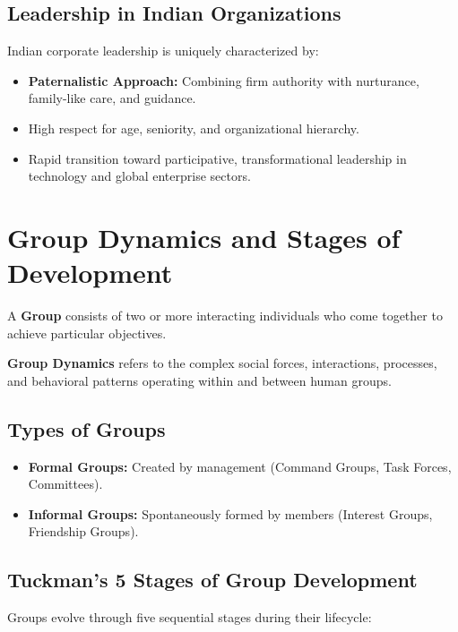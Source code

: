 \documentclass[12pt,a4paper]{article}
\begin{document}
\subsection{Leadership in Indian Organizations}
Indian corporate leadership is uniquely characterized by:
\begin{itemize}[leftmargin=*, itemsep=3pt]
  \item \textbf{Paternalistic Approach:} Combining firm authority with nurturance, family-like care, and guidance.
  \item High respect for age, seniority, and organizational hierarchy.
  \item Rapid transition toward participative, transformational leadership in technology and global enterprise sectors.
\end{itemize}

\section{Group Dynamics and Stages of Development}

A \textbf{Group} consists of two or more interacting individuals who come together to achieve particular objectives.

\begin{tcolorbox}[defbox, title={Concept of Group Dynamics}]
  \textbf{Group Dynamics} refers to the complex social forces, interactions, processes, and behavioral patterns operating within and between human groups.
\end{tcolorbox}

\subsection{Types of Groups}
\begin{itemize}[leftmargin=*, itemsep=3pt]
  \item \textbf{Formal Groups:} Created by management (Command Groups, Task Forces, Committees).
  \item \textbf{Informal Groups:} Spontaneously formed by members (Interest Groups, Friendship Groups).
\end{itemize}

\subsection{Tuckman's 5 Stages of Group Development}
Groups evolve through five sequential stages during their lifecycle:
\end{document}
